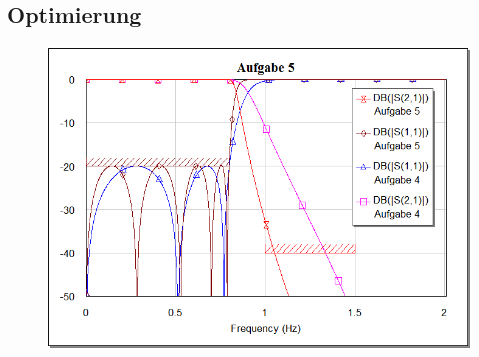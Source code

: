 \subsection{Optimierung}

\begin{figure}
    \centering
    \includegraphics[width=\linewidth]{images/vor-nach-optimierung}
    \caption{}
    \label{fig:vor-nach-optimierung}
\end{figure}

